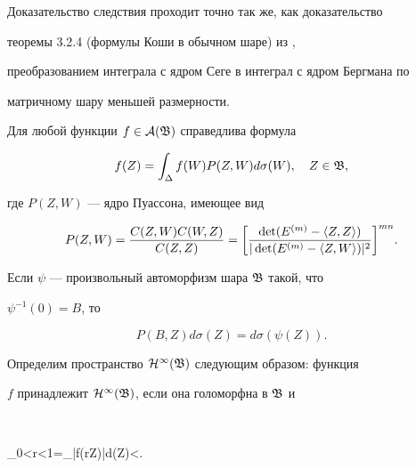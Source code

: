  


Доказательство следствия проходит точно так же, как доказательство 


теоремы 3.2.4 (формулы Коши в обычном шаре) из \cite{5}, 


преобразованием интеграла с ядром Сеге в интеграл с ядром Бергмана по 


матричному шару меньшей размерности. 


 


\begin{cor} 


Для любой функции $f\in\cal A(\frak B)$ справедлива формула 


$$ 


f(Z)=\int_\Delta f(W)P(Z,W)d\sigma(W),\quad Z\in\frak B, 


$$ 


где $P(Z,W)$ --- ядро Пуассона, имеющее вид 


$$ 


P(Z,W)=\frac{C(Z,W)C(W,Z)}{C(Z,Z)}=\bigg[ 


\frac{\det(E^{(m)}-\la Z,Z\ra)} 


{|\det(E^{(m)}-\la Z,W\ra)|^2}\bigg]^{mn}. 


$$ 


\end{cor} 


 


\begin{cor} 


Если $\psi$ --- произвольный автоморфизм шара $\frak B$ такой, что 


$\psi^{-1}(0)=B$, то 


\begin{equation} 


P(B,Z)d\sigma(Z)=d\sigma(\psi(Z)). 


\end{equation} 


\end{cor} 


 


Определим пространство $\cal H^1(\frak B)$ следующим образом: функция 


$f$ принадлежит $\cal H^1(\frak B)$, если она голоморфна в $\frak B$ и 


$$ 


\sup_{0<r<1}=\int_\Delta|f(rZ)|d\sigma(Z)<\infty. 


